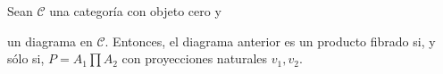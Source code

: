 \documentclass[tesis]{subfiles}
\begin{document}
\begin{Obs}
\begin{enumerate}[label=(\arabic*)]
        \end{enumerate}
\end{Obs}

\begin{Lema}\label{Mendoza-1.8.9}
    Sean $\mathscr{C}$ una categoría con objeto cero y
    \begin{center}
    \end{center}
    un diagrama en $\mathscr{C}$. Entonces, el diagrama anterior es un producto fibrado si, y sólo si, $P=A_1\prod A_2$ con proyecciones naturales $v_1,v_2$.
\end{Lema}
\end{document}
